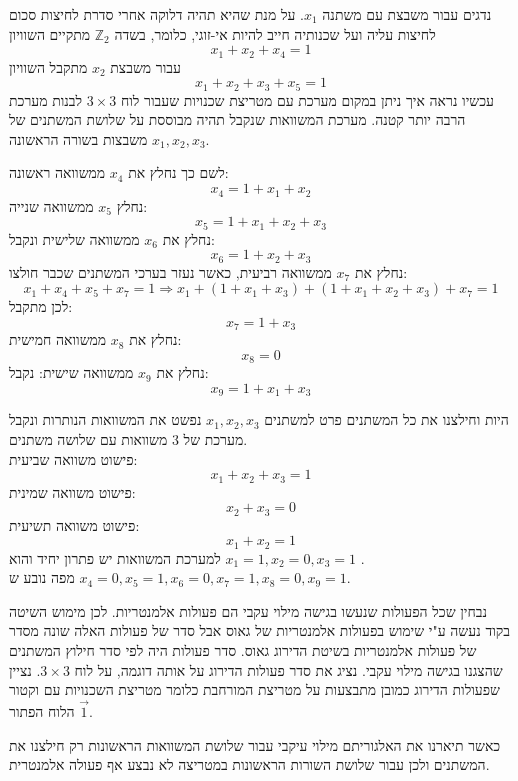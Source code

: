 \documentclass[12pt,leqno]{article}
\theoremstyle{theoremdd}
\begin{document}
נדגים עבור משבצת עם משתנה 
$x_1$. 
על מנת שהיא תהיה דלוקה אחרי סדרת לחיצות סכום לחיצות עליה ועל שכנותיה חייב להיות אי-זוגי, כלומר, בשדה 
$\mathbb{Z}_2$
מתקיים השוויון
\[ x_1+x_2+x_4=1 \]
עבור משבצת 
$x_2$
מתקבל השוויון
\[ x_1+x_2+x_3+x_5=1 \]
עכשיו נראה איך ניתן במקום מערכת עם מטריצת שכנויות שעבור לוח 
$3\times 3$
לבנות מערכת הרבה יותר קטנה.
מערכת המשוואות שנקבל תהיה מבוססת על שלושת המשתנים של משבצות בשורה הראשונה
$x_1, x_2, x_3$.

לשם כך נחלץ את 
$x_4$
ממשוואה ראשונה:
\[x_4=1+x_1+x_2\]
נחלץ 
$x_5$
ממשוואה שנייה:
\[x_5=1+x_1+x_2+x_3\]
נחלץ את 
$x_6$
ממשוואה שלישית
ונקבל:
\[x_6=1+x_2+x_3\]
נחלץ את 
$x_7$
ממשוואה רביעית,
כאשר
נעזר בערכי המשתנים שכבר חולצו:
\[x_1 + x_4 + x_5 + x_7 = 1 \Rightarrow 
x_1  + ( 1+x_1+x_3 ) + ( 1+x_1+x_2+x_3 ) +  x_7=1
\] 
לכן 
מתקבל:
\[x_7=1+x_3\]
נחלץ את 
$x_8$
ממשוואה חמישית:
\[x_8=0\]
נחלץ את 
$x_9$
ממשוואה שישית:
נקבל:
\[x_9=1 + x_1 + x_3\]

היות וחילצנו את כל המשתנים פרט למשתנים 
$x_1, x_2, x_3$
נפשט את המשוואות הנותרות ונקבל
מערכת של 
$3$
משוואות עם שלושה משתנים.
\\
פישוט משוואה 
שביעית:
\[x_1+x_2+x_3 = 1\]
פישוט משוואה 
שמינית:
\[x_2+x_3 = 0\]
פישוט משוואה 
תשיעית:
\[x_1+x_2=1\]
למערכת המשוואות 
יש פתרון יחיד והוא 
$x_1=1, x_2=0, x_3=1$
.
\\
מפה נובע ש
$x_4 =0, x_5 =1, x_6 =0, x_7 =1, x_8 =0, x_9 =1$.

נבחין 
שכל הפעולות שנעשו בגישה מילוי עקבי הם פעולות אלמנטריות.
לכן מימוש השיטה בקוד נעשה ע"י שימוש בפעולות אלמנטריות של גאוס
אבל סדר של פעולות האלה שונה מסדר של פעולות אלמנטריות בשיטת הדירוג גאוס.
סדר פעולות היה לפי סדר חילוץ המשתנים שהצגנו בגישה מילוי עקבי.
נציג את סדר פעולות הדירוג על אותה דוגמה, על לוח 
$3 \times 3$.
נציין שפעולות הדירוג כמובן מתבצעות על מטריצת המורחבת כלומר מטריצת השכנויות 
עם וקטור הלוח הפתור
$\vec 1$.

כאשר תיארנו את האלגוריתם מילוי עיקבי
עבור שלושת המשוואות הראשונות רק חילצנו את המשתנים
ולכן
עבור שלושת השורות הראשונות במטריצה לא נבצע אף פעולה אלמנטרית.
\end{document}

